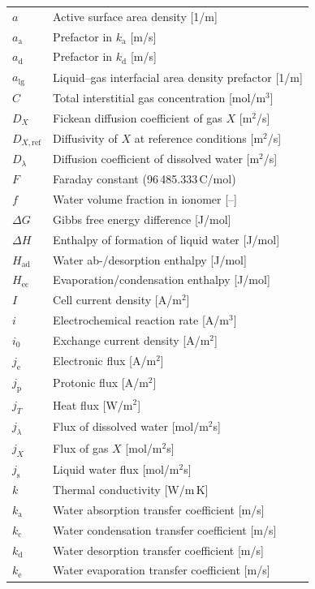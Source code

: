 \documentclass[fontsize=9pt,DIV=calc,a4paper,twocolumn]{scrartcl}
\begin{document}
\begin{xtabular}{@{}ll@{}}
$a$ & Active surface area density [1/m]\\
$a_\mathrm{a}$ & Prefactor in $k_\mathrm{a}$ [m/s]\\
$a_\mathrm{d}$ & Prefactor in $k_\mathrm{d}$ [m/s]\\
$a_\mathrm{lg}$ & Liquid--gas interfacial area density prefactor [1/m]\\
$C$ & Total interstitial gas concentration [mol/m$^3$]\\
$D_X$ & Fickean diffusion coefficient of gas $X$ [m$^2$/s]\\
$D_{X,\mathrm{ref}}$ & Diffusivity of $X$ at reference conditions [m$^2$/s]\\
$D_\lambda$ & Diffusion coefficient of dissolved water [m$^2$/s]\\
$F$ & Faraday constant (96\,485.333\,C/mol)\\
$f$ & Water volume fraction in ionomer [--]\\
$\Delta G$ & Gibbs free energy difference [J/mol]\\
$\Delta H$ & Enthalpy of formation of liquid water [J/mol]\\
$H_\mathrm{ad}$ & Water ab-/desorption enthalpy [J/mol]\\
$H_\mathrm{ec}$ & Evaporation/condensation enthalpy [J/mol]\\
$I$ & Cell current density [A/m$^2$]\\
$i$ & Electrochemical reaction rate [A/m$^3$]\\
$i_0$ & Exchange current density [A/m$^2$]\\
$j_\mathrm{e}$ & Electronic flux [A/m$^2$]\\
$j_\mathrm{p}$ & Protonic flux [A/m$^2$]\\
$j_T$ & Heat flux [W/m$^2$]\\
$j_\lambda$ & Flux of dissolved water [mol/m$^2$s]\\
$j_X$ & Flux of gas $X$ [mol/m$^2$s]\\
$j_\mathrm{s}$ & Liquid water flux [mol/m$^2$s]\\
$k$ & Thermal conductivity [W/m\,K]\\
$k_\mathrm{a}$ & Water absorption transfer coefficient [m/s]\\
$k_\mathrm{c}$ & Water condensation transfer coefficient [m/s]\\
$k_\mathrm{d}$ & Water desorption transfer coefficient [m/s]\\
$k_\mathrm{e}$ & Water evaporation transfer coefficient [m/s]\\

\end{xtabular}
\end{document}

